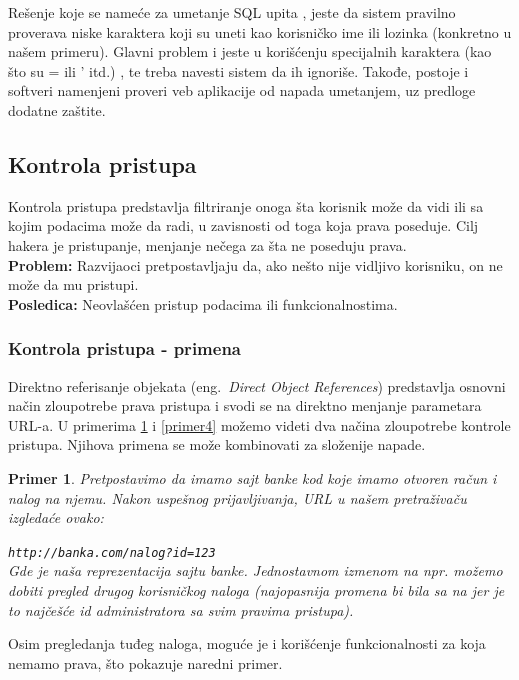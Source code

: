 \documentclass[a4paper]{article}
\newtheorem{primer}{Primer}[section]
\begin{document}
Rešenje koje se nameće za umetanje SQL upita \cite{SQL_prev}, jeste da sistem pravilno proverava niske karaktera koji su uneti kao korisničko ime ili lozinka (konkretno u našem primeru). Glavni problem i jeste u korišćenju specijalnih karaktera (kao što su = ili ' itd.) \cite{Sanit} , te treba navesti sistem da ih ignoriše. Takođe, postoje i softveri namenjeni proveri  veb aplikacije od napada umetanjem, uz predloge dodatne zaštite.

\subsection{Kontrola pristupa}

Kontrola pristupa \cite{AC} predstavlja filtriranje onoga šta korisnik može da vidi ili sa kojim podacima može da radi,  u zavisnosti od toga koja prava poseduje. Cilj hakera je pristupanje, menjanje nečega za šta ne poseduju prava.\\
\textbf{Problem:} Razvijaoci pretpostavljaju da, ako nešto nije vidljivo korisniku, on ne može da mu pristupi.\\
\textbf{Posledica:} Neovlašćen pristup podacima ili funkcionalnostima.

\subsubsection{Kontrola pristupa - primena}

Direktno referisanje objekata (eng.~{\em Direct Object References}) predstavlja osnovni način zloupotrebe prava pristupa i svodi se na direktno menjanje parametara URL-a. U primerima \ref{primer3} i \ref{primer4} možemo videti dva načina zloupotrebe kontrole pristupa. Njihova primena se može kombinovati za složenije napade.
\begin{primer}
\label{primer3}
Pretpostavimo da imamo sajt banke kod koje imamo otvoren račun i nalog na njemu. Nakon uspešnog prijavljivanja, URL u našem pretraživaču izgledaće ovako:

\texttt{http://banka.com/nalog?id=123}\\
Gde je  naša reprezentacija sajtu banke. Jednostavnom izmenom  na npr.  možemo dobiti pregled drugog korisničkog naloga (najopasnija promena bi bila sa  na  jer je to najčešće id administratora sa svim pravima pristupa).
\end{primer}
Osim pregledanja tuđeg naloga, moguće je i korišćenje funkcionalnosti za koja nemamo prava, što pokazuje naredni primer.
\end{document}
